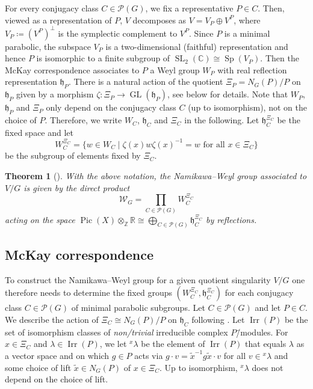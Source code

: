 \documentclass[a4paper]{amsart}
\theoremstyle{plain}
\newtheorem{theorem}{Theorem}[section]
\theoremstyle{definition}
\theoremstyle{remark}
\DeclareMathOperator{\GL}{GL}
\DeclareMathOperator{\Irr}{Irr}
\DeclareMathOperator{\Pic}{Pic}
\DeclareMathOperator{\SL}{SL}
\DeclareMathOperator{\Sp}{Sp}
\newcommand{\CC}{\mathbb C}
\newcommand{\RR}{\mathbb R}
\newcommand{\ZZ}{\mathbb Z}
\begin{document}
For every conjugacy class \(C\in\mathcal P(G)\), we fix a representative \(P\in C\). 
Then, viewed as a representation of \(P\), \(V\) decomposes as $V = V_P \oplus V^P$, where $V_P \coloneqq (V^P)^{\perp}$ is the symplectic complement to $V^P$. Since $P$ is a minimal parabolic, the subspace $V_P$ is a two-dimensional (faithful) representation and hence \(P\) is isomorphic to a finite subgroup of \(\SL_2(\CC) \cong \Sp(V_P)\).
Then the McKay correspondence \cite{McK80,GV83} associates to \(P\) a Weyl group \(W_P\) with real reflection representation \(\mathfrak h_P\).
There is a natural action of the quotient \(\Xi_P = N_G(P) / P\) on \(\mathfrak h_P\) given by a morphism \(\zeta: \Xi_P \to \GL(\mathfrak h_P)\), see below for details.
Note that \(W_P\), \(\mathfrak h_P\) and \(\Xi_P\) only depend on the conjugacy class \(C\) (up to isomorphism), not on the choice of \(P\). Therefore, we write \(W_C\), \(\mathfrak h_C\) and \(\Xi_C\) in the following.
Let \(\mathfrak h_C^{\Xi_C}\) be the fixed space and let \[W_C^{\Xi_C} = \{w \in W_C \mid \zeta(x) w \zeta(x)^{-1} = w\text{ for all }x\in \Xi_C\}\] be the subgroup of elements fixed by $\Xi_C$.

\begin{theorem}[{\cite[Thm.~1.3]{Bel16}}]
  \label{thm:directproduct}
  With the above notation, the Namikawa--Weyl group associated to \(V/G\) is given by the direct product \[\mathcal W_G = \prod_{C\in\mathcal P(G)} W_C^{\Xi_C}\] acting on the space \(\Pic(X)\otimes_\ZZ\RR \cong \bigoplus_{C\in\mathcal P(G)} \mathfrak h_C^{\Xi_C}\) by reflections.
\end{theorem}

\subsection{McKay correspondence}
To construct the Namikawa--Weyl group for a given quotient singularity \(V/G\) one therefore needs to determine the fixed groups \((W_C^{\Xi_C}, \mathfrak h_C^{\Xi_C})\) for each conjugacy class \(C\in \mathcal P(G)\) of minimal parabolic subgroups.
Let \(C\in \mathcal P(G)\) and let \(P\in C\).
We describe the action of \(\Xi_C \cong N_G(P)/P\) on \(\mathfrak h_C\) following \cite[Sect.~2.1]{Bel16}.
Let \(\Irr(P)\) be the set of isomorphism classes of \emph{non\-/trivial} irreducible complex \(P\)\=/modules.
For \(x\in \Xi_C\) and \(\lambda\in \Irr(P)\), we let \({}^x\lambda\) be the element of \(\Irr(P)\) that equals \(\lambda\) as a vector space and on which \(g\in P\) acts via \(g\cdot v = \tilde{x}^{-1} g \tilde{x} \cdot v\) for all \(v\in {}^x\lambda\) and some choice of lift $\tilde{x} \in N_G(P)$ of $x \in \Xi_C$. Up to isomorphism, ${}^x \lambda$ does not depend on the choice of lift. 
\end{document}
